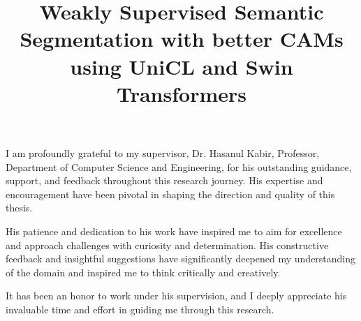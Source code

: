 \documentclass{iutbscthesis}
\title{\Large{Weakly Supervised Semantic Segmentation with better CAMs using UniCL and Swin Transformers}}
\begin{document}

\coverpage


\titlepage

\declarationofcandidate


\tableofcontents
\listoffigures
\listoftables

\clearpage



\begin{acknowledgement}
    I am profoundly grateful to my supervisor, Dr. Hasanul Kabir, Professor, Department of Computer Science and Engineering, for his outstanding guidance, support, and feedback throughout this research journey. His expertise and encouragement have been pivotal in shaping the direction and quality of this thesis.

His patience and dedication to his work have inspired me to aim for excellence and approach challenges with curiosity and determination. His constructive feedback and insightful suggestions have significantly deepened my understanding of the domain and inspired me to think critically and creatively.

It has been an honor to work under his supervision, and I deeply appreciate his invaluable time and effort in guiding me through this research.
\end{acknowledgement}
\end{document}
